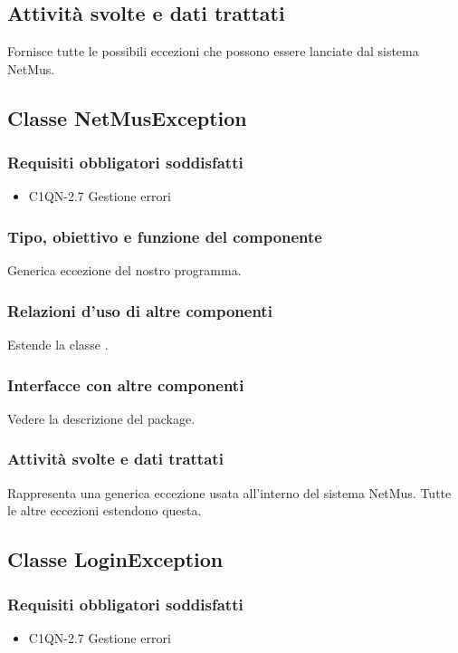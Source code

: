 \subsection*{Attivit\`a svolte e dati trattati}
Fornisce tutte le possibili eccezioni che possono essere lanciate dal sistema
NetMus.

\subsection{Classe NetMusException}
\subsubsection*{Requisiti obbligatori soddisfatti}
\begin{itemize}
	\item C1QN-2.7 Gestione errori
\end{itemize}
\subsubsection*{Tipo, obiettivo e funzione del componente}
Generica eccezione del nostro programma.
\subsubsection*{Relazioni d'uso di altre componenti}
Estende la classe .
\subsubsection*{Interfacce con altre componenti}
Vedere la descrizione del package.
\subsubsection*{Attivit\`a svolte e dati trattati}
Rappresenta una generica eccezione usata all'interno del sistema NetMus. Tutte
le altre eccezioni estendono questa.

\subsection{Classe LoginException}
\subsubsection*{Requisiti obbligatori soddisfatti}
\begin{itemize}
	\item C1QN-2.7 Gestione errori
\end{itemize}
